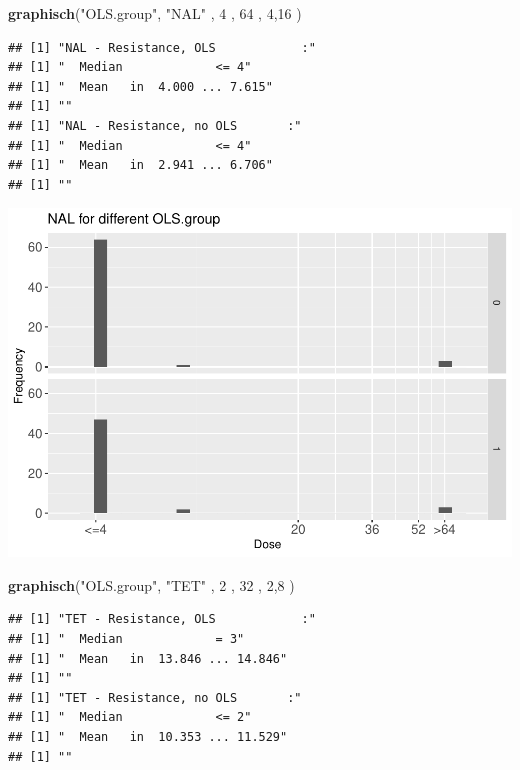 \documentclass[
]{article}
\newenvironment{Shaded}{\begin{snugshade}}{\end{snugshade}}
\newcommand{\DecValTok}[1]{\textcolor[rgb]{0.00,0.00,0.81}{#1}}
\newcommand{\KeywordTok}[1]{\textcolor[rgb]{0.13,0.29,0.53}{\textbf{#1}}}
\newcommand{\NormalTok}[1]{#1}
\newcommand{\StringTok}[1]{\textcolor[rgb]{0.31,0.60,0.02}{#1}}
\begin{document}
\begin{Shaded}
\begin{Highlighting}[]
  \KeywordTok{graphisch}\NormalTok{(}\StringTok{"OLS.group"}\NormalTok{, }\StringTok{"NAL"}\NormalTok{ , }\DecValTok{4}\NormalTok{    ,  }\DecValTok{64}\NormalTok{   ,   }\DecValTok{4}\NormalTok{,}\DecValTok{16}\NormalTok{    ) }
\end{Highlighting}
\end{Shaded}

\begin{verbatim}
## [1] "NAL - Resistance, OLS            :"
## [1] "  Median             <= 4"
## [1] "  Mean   in  4.000 ... 7.615"
## [1] ""
## [1] "NAL - Resistance, no OLS       :"
## [1] "  Median             <= 4"
## [1] "  Mean   in  2.941 ... 6.706"
## [1] ""
\end{verbatim}

\includegraphics{Verteilungen_files/figure-latex/unnamed-chunk-27-1.pdf}

\begin{Shaded}
\begin{Highlighting}[]
  \KeywordTok{graphisch}\NormalTok{(}\StringTok{"OLS.group"}\NormalTok{, }\StringTok{"TET"}\NormalTok{ , }\DecValTok{2}\NormalTok{    ,  }\DecValTok{32}\NormalTok{   ,   }\DecValTok{2}\NormalTok{,}\DecValTok{8}\NormalTok{    ) }
\end{Highlighting}
\end{Shaded}

\begin{verbatim}
## [1] "TET - Resistance, OLS            :"
## [1] "  Median             = 3"
## [1] "  Mean   in  13.846 ... 14.846"
## [1] ""
## [1] "TET - Resistance, no OLS       :"
## [1] "  Median             <= 2"
## [1] "  Mean   in  10.353 ... 11.529"
## [1] ""
\end{verbatim}
\end{document}
